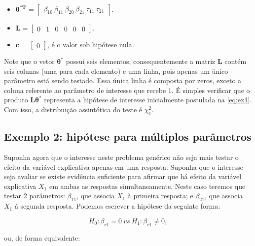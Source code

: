 \begin{itemize}
  
  \item $\boldsymbol{\theta^{*T}}$ = $\begin{bmatrix} \beta_{10} \  \beta_{11} \ \beta_{20} \ \beta_{21} \ \tau_{11} \ \tau_{21} \end{bmatrix}$.

\item $\boldsymbol{L} = \begin{bmatrix} 0 & 1 & 0 & 0 & 0 & 0  \end{bmatrix}.$
 
\item $\boldsymbol{c}$ = $\begin{bmatrix} 0 \end{bmatrix}$, é o valor sob hipótese nula. 
\end{itemize}

Note que o vetor $\boldsymbol{\theta^{*}}$ possui seis elementos, consequentemente a matriz $\boldsymbol{L}$ contém seis colunas (uma para cada elemento) e uma linha, pois apenas um único parâmetro está sendo testado. Essa única linha é composta por zeros, exceto a coluna referente ao parâmetro de interesse que recebe 1. É simples verificar que o produto $\boldsymbol{L}\boldsymbol{\theta^{*}}$ representa a hipótese de interesse inicialmente postulada na \autoref{eq:ex1}. Com isso, a distribuição assintótica do teste é $\chi^2_1$.

\subsection{Exemplo 2: hipótese para múltiplos parâmetros}\label{sec:ex2}

Suponha agora que o interesse neste problema genérico não seja mais testar o efeito da variável explicativa apenas em uma resposta. Suponha que o interesse seja avaliar se existe evidência suficiente para afirmar que há efeito da variável explicativa $X_1$ em ambas as respostas simultaneamente. Neste caso teremos que testar 2 parâmetros: $\beta_{11}$, que associa $X_1$ à primeira resposta; e $\beta_{21}$, que associa $X_1$ à segunda resposta. Podemos escrever a hipótese da seguinte forma:

\begin{equation}
\label{eq:ex2}
H_0: \beta_{r1} = 0 \ vs \ H_1: \beta_{r1} \neq 0,
\end{equation}

\noindent ou, de forma equivalente:

